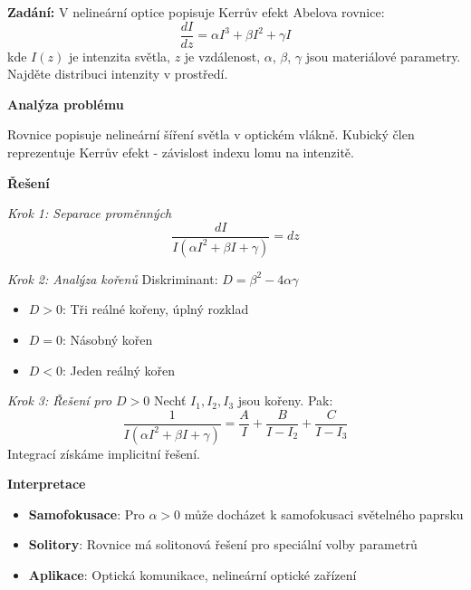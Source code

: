 \begin{example}
\label{ex:optika-kerr}

\noindent\textbf{Zadání:} V nelineární optice popisuje Kerrův efekt Abelova rovnice:
\[
\frac{dI}{dz} = \alpha I^3 + \beta I^2 + \gamma I
\]
kde $I(z)$ je intenzita světla, $z$ je vzdálenost, $\alpha$, $\beta$, $\gamma$ jsou materiálové parametry. Najděte distribuci intenzity v prostředí.

\vspace{1.5\baselineskip}

\noindent\textbf{Analýza problému}

Rovnice popisuje nelineární šíření světla v optickém vlákně. Kubický člen reprezentuje Kerrův efekt - závislost indexu lomu na intenzitě.

\vspace{1.5\baselineskip}

\noindent\textbf{Řešení}

\noindent\textit{Krok 1: Separace proměnných}
\[
\frac{dI}{I(\alpha I^2 + \beta I + \gamma)} = dz
\]

\vspace{1\baselineskip}

\noindent\textit{Krok 2: Analýza kořenů}
Diskriminant: $D = \beta^2 - 4\alpha\gamma$
\begin{itemize}
\item $D > 0$: Tři reálné kořeny, úplný rozklad
\item $D = 0$: Násobný kořen
\item $D < 0$: Jeden reálný kořen
\end{itemize}

\vspace{1\baselineskip}

\noindent\textit{Krok 3: Řešení pro $D > 0$}
Nechť $I_1, I_2, I_3$ jsou kořeny. Pak:
\[
\frac{1}{I(\alpha I^2 + \beta I + \gamma)} = \frac{A}{I} + \frac{B}{I - I_2} + \frac{C}{I - I_3}
\]
Integrací získáme implicitní řešení.

\vspace{1.5\baselineskip}

\noindent\textbf{Interpretace}
\begin{itemize}
\item \textbf{Samofokusace}: Pro $\alpha > 0$ může docházet k samofokusaci světelného paprsku
\item \textbf{Solitory}: Rovnice má solitonová řešení pro speciální volby parametrů
\item \textbf{Aplikace}: Optická komunikace, nelineární optické zařízení
\end{itemize}

\end{example}


